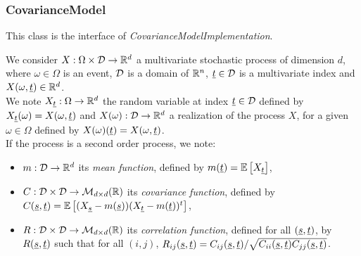 \subsubsection{CovarianceModel}

This class is the interface of \textit{CovarianceModelImplementation}.

We consider $X: \Omega \times{\mathcal D} \rightarrow {\mathbb R}^d$ a multivariate stochastic process of dimension $d$, where $\omega \in \Omega$ is an event, ${\mathcal D}$ is a domain of ${\mathbb R}^n$, ${\underline{t}}\in {\mathcal D}$ is a multivariate index and $X(\omega, {\underline{t}}) \in {\mathbb R}^d$.\\
We note $X_{{\underline{t}}}: \Omega \rightarrow {\mathbb R}^d$ the random variable at index ${\underline{t}} \in {\mathcal D}$ defined by $X_{{\underline{t}}}(\omega)=X(\omega, {\underline{t}})$ and $X(\omega): {\mathcal D}  \rightarrow {\mathbb R}^d$ a realization of the process $X$, for a given $\omega \in \Omega$ defined by $X(\omega)({\underline{t}})=X(\omega, {\underline{t}})$.\\

If the process is a second order process, we note:
\begin{itemize}
\item  $m : {\mathcal D} \rightarrow  {\mathbb R}^d$ its \emph{mean function},  defined  by $m({\underline{t}})={\mathbb E}\left[ X_{{\underline{t}}} \right]$,
\item $C : {\mathcal D} \times {\mathcal D} \rightarrow  {\mathcal M}_{d \times d}({\mathbb R})$ its    \emph{covariance function},  defined  by $C({\underline{s}}, {\underline{t}})={\mathbb E}\left[ (X_{{\underline{s}}}-m({\underline{s}}))(X_{{\underline{t}}}-m({\underline{t}}))^t \right]$,
\item  $R : {\mathcal D} \times {\mathcal D} \rightarrow  \mathcal{M}_{d \times d}({\mathbb R})$ its \emph{ correlation function}, defined for all $({\underline{s}}, {\underline{t}})$, by $R({\underline{s}}, {\underline{t}})$ such that for all $(i,j)$, $R_{ij}({\underline{s}}, {\underline{t}})=C_{ij}({\underline{s}}, {\underline{t}})/\sqrt{C_{ii}({\underline{s}}, {\underline{t}})C_{jj}({\underline{s}}, {\underline{t}})}$.
\end{itemize}



